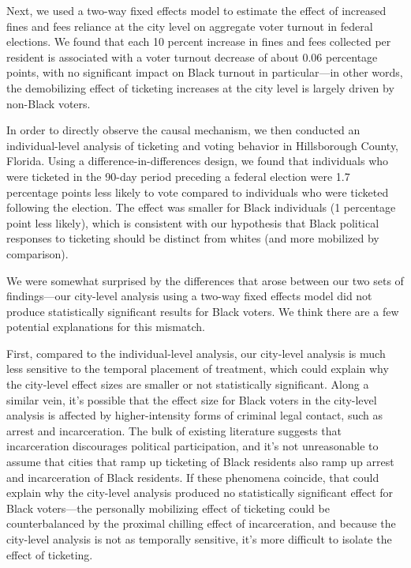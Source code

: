 \documentclass[
  12pt,
]{article}
\begin{document}
Next, we used a two-way fixed effects model to estimate the effect of increased fines and fees reliance at the city level on aggregate voter turnout in federal elections. We found that each 10 percent increase in fines and fees collected per resident is associated with a voter turnout decrease of about 0.06 percentage points, with no significant impact on Black turnout in particular---in other words, the demobilizing effect of ticketing increases at the city level is largely driven by non-Black voters.

In order to directly observe the causal mechanism, we then conducted an individual-level analysis of ticketing and voting behavior in Hillsborough County, Florida. Using a difference-in-differences design, we found that individuals who were ticketed in the 90-day period preceding a federal election were 1.7 percentage points less likely to vote compared to individuals who were ticketed following the election. The effect was smaller for Black individuals (1 percentage point less likely), which is consistent with our hypothesis that Black political responses to ticketing should be distinct from whites (and more mobilized by comparison).

We were somewhat surprised by the differences that arose between our two sets of findings---our city-level analysis using a two-way fixed effects model did not produce statistically significant results for Black voters. We think there are a few potential explanations for this mismatch.

First, compared to the individual-level analysis, our city-level analysis is much less sensitive to the temporal placement of treatment, which could explain why the city-level effect sizes are smaller or not statistically significant. Along a similar vein, it's possible that the effect size for Black voters in the city-level analysis is affected by higher-intensity forms of criminal legal contact, such as arrest and incarceration. The bulk of existing literature suggests that incarceration discourages political participation, and it's not unreasonable to assume that cities that ramp up ticketing of Black residents also ramp up arrest and incarceration of Black residents. If these phenomena coincide, that could explain why the city-level analysis produced no statistically significant effect for Black voters---the personally mobilizing effect of ticketing could be counterbalanced by the proximal chilling effect of incarceration, and because the city-level analysis is not as temporally sensitive, it's more difficult to isolate the effect of ticketing.
\end{document}
